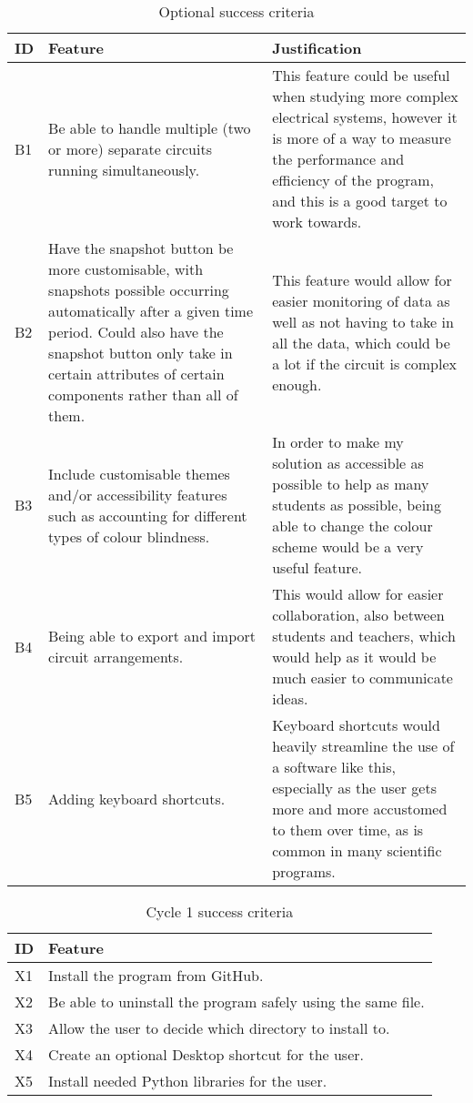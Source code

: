 \newpage
\begin{table}[!ht]
    \centering
    \footnotesize
    \begin{tabular}{@{}lp{206pt}p{210pt}@{}}
        \toprule
        \textbf{ID} & \textbf{Feature} & \textbf{Justification} \\ \midrule
        B1 & Be able to handle multiple (two or more) separate circuits running simultaneously. & This feature could be useful when studying more complex electrical systems, however it is more of a way to measure the performance and efficiency of the program, and this is a good target to work towards. \\ \medskip
        B2 & Have the snapshot button be more customisable, with snapshots possible occurring automatically after a given time period. Could also have the snapshot button only take in certain attributes of certain components rather than all of them. & This feature would allow for easier monitoring of data as well as not having to take in all the data, which could be a lot if the circuit is complex enough. \\ \medskip
        B3 & Include customisable themes and/or accessibility features such as accounting for different types of colour blindness. & In order to make my solution as accessible as possible to help as many students as possible, being able to change the colour scheme would be a very useful feature. \\ \medskip
        B4 & Being able to export and import circuit arrangements. & This would allow for easier collaboration, also between students and teachers, which would help as it would be much easier to communicate ideas. \\ \medskip
        B5 & Adding keyboard shortcuts. & Keyboard shortcuts would heavily streamline the use of a software like this, especially as the user gets more and more accustomed to them over time, as is common in many scientific programs. \\
        \bottomrule
    \end{tabular}
    \caption{Optional success criteria}
    \label{tbl:optional_succ_crit}
\end{table}


\newpage
\begin{table}[!ht]
    \centering
    \begin{tabular}{@{}ll@{}} \toprule
        \textbf{ID} & \textbf{Feature} \\ \midrule
        X1 & Install the program from GitHub. \\ 
        X2 & Be able to uninstall the program safely using the same file. \\ 
        X3 & Allow the user to decide which directory to install to. \\ 
        X4 & Create an optional Desktop shortcut for the user. \\ 
        X5 & Install needed Python libraries for the user. \\
        \bottomrule
    \end{tabular}
    \caption{Cycle 1 success criteria}
    \label{tbl:succ_crit_c1}
\end{table}


